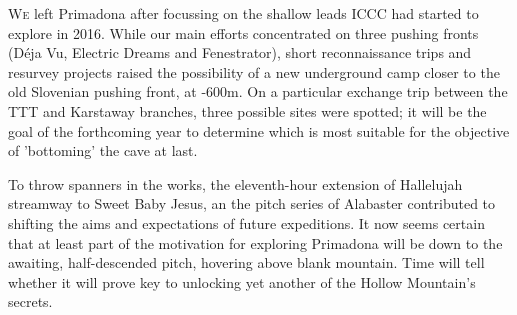 \newpage
  
\begin{tcolorbox}
	
	\lettrine{W}{e} left Primadona after focussing on the shallow leads ICCC had started to explore in 2016. While our main efforts concentrated on three pushing fronts (Déja Vu, Electric Dreams and Fenestrator), short reconnaissance trips and resurvey projects raised the possibility of a new underground camp closer to the old Slovenian pushing front, at -600m. On a particular exchange trip between the TTT and Karstaway branches, three possible sites were spotted; it will be the goal of the forthcoming year to determine which is most suitable for the objective of 'bottoming' the cave at last. 

	To throw spanners in the works, the eleventh-hour extension of Hallelujah streamway to Sweet Baby Jesus, an the pitch series of Alabaster contributed to shifting the aims and expectations of future expeditions. It now seems certain that at least part of the motivation for exploring Primadona will be down to the awaiting, half-descended pitch, hovering above blank mountain. Time will tell whether it will prove key to unlocking yet another of the Hollow Mountain's secrets.
	\\
	\\
	\\

\end{tcolorbox}

\BgThispage

